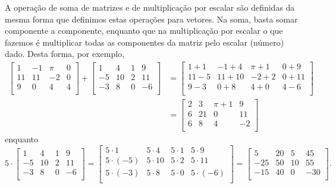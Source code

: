 A operação de soma de matrizes e de multiplicação por escalar são definidas da mesma forma que definimos estas operações para vetores. Na soma, basta somar componente a componente, enquanto que na multiplicação por escalar o que fazemos é multiplicar todas as componentes da matriz pelo escalar (número) dado. Desta forma, por exemplo,
\begin{align*}
\left[
\begin{array}{cccc}
1 & -1 & \pi & 0 \\
11 & 11 & -2 & 0 \\
9 & 0 & 4 & 4 \\
\end{array}
\right] +
\left[
\begin{array}{cccc}
1 & 4 & 1 & 9 \\
-5 & 10 & 2 & 11 \\
-3 & 8 & 0 & -6 \\
\end{array}
\right] & =
\left[
\begin{array}{cccc}
1+1 & -1 +4 & \pi + 1 & 0+ 9 \\
11-5 & 11+10 & -2+2 & 0+11 \\
9-3 & 0+8 & 4+0 & 4-6 \\
\end{array}
\right] \\
& =
\left[
\begin{array}{cccc}
2 & 3 & \pi + 1 & 9 \\
6 & 21 & 0 & 11 \\
6 & 8 & 4 & -2 \\
\end{array}
\right]
\end{align*}
enquanto
\begin{equation}
5\cdot \left[
\begin{array}{cccc}
1 & 4 & 1 & 9 \\
-5 & 10 & 2 & 11 \\
-3 & 8 & 0 & -6 \\
\end{array}
\right] =
\left[
\begin{array}{cccc}
5\cdot 1 & 5\cdot 4 & 5\cdot 1 & 5\cdot 9 \\
5\cdot (-5) & 5\cdot 10 & 5\cdot 2 & 5\cdot 11 \\
5\cdot (-3) & 5\cdot 8 & 5\cdot 0 & 5\cdot (-6) \\
\end{array}
\right] =
\left[
\begin{array}{cccc}
5 & 20 & 5 & 45 \\
-25 & 50 & 10 & 55 \\
-15 & 40 & 0 & -30 \\
\end{array}
\right].
\end{equation}

